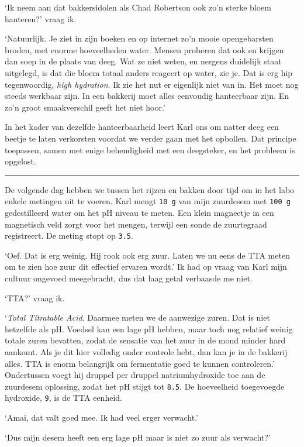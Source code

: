 \documentclass[
  11pt,
  dutch,
]{memoir}
\begin{document}
`Ik neem aan dat bakkersidolen als Chad Robertson ook zo'n sterke bloem
hanteren?' vraag ik.

`Natuurlijk. Je ziet in zijn boeken en op internet zo'n mooie
opengebarsten broden, met enorme hoeveelheden water. Mensen proberen dat
ook en krijgen dan soep in de plaats van deeg. Wat ze niet weten, en
nergens duidelijk staat uitgelegd, is dat die bloem totaal anders
reageert op water, zie je. Dat is erg hip tegenwoordig, \emph{high
hydration}. Ik zie het nut er eigenlijk niet van in. Het moet nog steeds
werkbaar zijn. In een bakkerij moet alles eenvoudig hanteerbaar zijn. En
zo'n groot smaakverschil geeft het niet hoor.'

In het kader van dezelfde hanteerbaarheid leert Karl ons om natter deeg
een beetje te laten verkorsten voordat we verder gaan met het opbollen.
Dat principe toepassen, samen met enige behendigheid met een deegsteker,
en het probleem is opgelost.

\pfbreak

De volgende dag hebben we tussen het rijzen en bakken door tijd om in
het labo enkele metingen uit te voeren. Karl mengt \texttt{10\ g} van
mijn zuurdesem met \texttt{100\ g} gedestilleerd water om het pH niveau
te meten. Een klein magneetje in een magnetisch veld zorgt voor het
mengen, terwijl een sonde de zuurtegraad registreert. De meting stopt op
\texttt{3.5}.

`Oef. Dat is erg weinig. Hij rook ook erg zuur. Laten we nu eens de TTA
meten om te zien hoe zuur dit effectief ervaren wordt.' Ik had op vraag
van Karl mijn cultuur ongevoed meegebracht, dus dat laag getal verbaasde
me niet.

`TTA?' vraag ik.

`\emph{Total Titratable Acid}. Daarmee meten we de aanwezige zuren. Dat
is niet hetzelfde als pH. Voedsel kan een lage pH hebben, maar toch nog
relatief weinig totale zuren bevatten, zodat de sensatie van het zuur in
de mond minder hard aankomt. Als je dit hier volledig onder controle
hebt, dan kan je in de bakkerij alles. TTA is enorm belangrijk om
fermentatie goed te kunnen controleren.' Ondertussen voegt hij druppel
per druppel natriumhydroxide toe aan de zuurdesem oplossing, zodat het
pH stijgt tot \texttt{8.5}. De hoeveelheid toegevoegde hydroxide,
\texttt{9}, is de TTA eenheid.

`Amai, dat valt goed mee. Ik had veel erger verwacht.'

`Dus mijn desem heeft een erg lage pH maar is niet zo zuur als
verwacht?'
\end{document}
